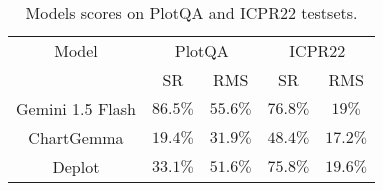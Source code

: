\begin{table}
 \begin{tabular}{ |c|c|c|c|c|}
 Model & \multicolumn{2}{|c|}{PlotQA} & \multicolumn{2}{|c|}{ICPR22} \\
 & SR & RMS & SR & RMS \\
     Gemini 1.5 Flash & $86.5\%$ & $55.6\%$ & $76.8\%$ & $19\%$ \\
 ChartGemma & $19.4\%$ & $31.9\%$ & $48.4\%$ & $17.2\%$ \\
 Deplot & $33.1\%$ & $51.6\%$ & $75.8\%$ & $19.6\%$ \\
 \end{tabular}
 \caption{Models scores on PlotQA and ICPR22 testsets.}
 \label{tab:final-scores}
  \end{table}

